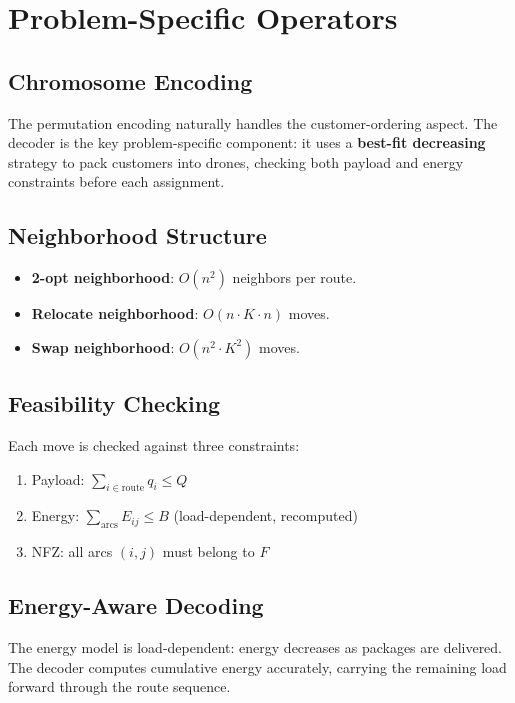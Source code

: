 \documentclass[12pt,a4paper]{article}
\begin{document}
\section{Problem-Specific Operators}

\subsection{Chromosome Encoding}
The permutation encoding naturally handles the customer-ordering aspect. The decoder is the key problem-specific component: it uses a \textbf{best-fit decreasing} strategy to pack customers into drones, checking both payload and energy constraints before each assignment.

\subsection{Neighborhood Structure}
\begin{itemize}[nosep]
  \item \textbf{2-opt neighborhood}: $O(n^2)$ neighbors per route.
  \item \textbf{Relocate neighborhood}: $O(n\cdot K\cdot n)$ moves.
  \item \textbf{Swap neighborhood}: $O(n^2\cdot K^2)$ moves.
\end{itemize}

\subsection{Feasibility Checking}
Each move is checked against three constraints:
\begin{enumerate}[nosep]
  \item Payload: $\sum_{i\in\text{route}} q_i \leq Q$
  \item Energy: $\sum_{\text{arcs}} E_{ij} \leq B$ (load-dependent, recomputed)
  \item NFZ: all arcs $(i,j)$ must belong to $F$
\end{enumerate}

\subsection{Energy-Aware Decoding}
The energy model is load-dependent: energy decreases as packages are delivered. The decoder computes cumulative energy accurately, carrying the remaining load forward through the route sequence.
\end{document}
